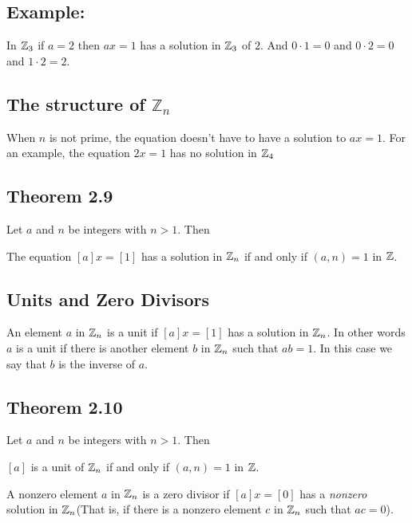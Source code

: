 \documentclass{article}
\begin{document}
\subsection*{Example:}
In $\mathbb{Z}_3$ if $a = 2$ then $ax=1$ has a solution in $\mathbb{Z}_3$ of $2$. And $0 \cdot 1 = 0$ and $0 \cdot 2 = 0$ and $1 \cdot 2 = 2$.

\subsection*{The structure of $\mathbb{Z}_n$}
When $n$ is not prime, the equation doesn't have to have a solution to $ax=1$. For an example, the equation $2x=1$ has no solution
in $\mathbb{Z}_4$

\subsection*{Theorem 2.9}
Let $a$ and $n$ be integers with $n > 1$. Then
\begin{center}
    The equation $[a]x=[1]$ has a solution in $\mathbb{Z}_n$ if and only if $(a,n)=1$ in $\mathbb{Z}$.
\end{center}
\subsection*{Units and Zero Divisors}
An element $a$ in $\mathbb{Z}_n$ is a unit if $[a]x=[1]$ has a solution in $\mathbb{Z}_n$. In other words $a$ is a unit if
there is another element $b$ in $\mathbb{Z}_n$ such that $ab=1$. In this case we say that $b$ is the inverse of $a$.
\subsection*{Theorem 2.10}
Let $a$ and $n$ be integers with $n > 1$. Then
\begin{center}
    $[a]$ is a unit of $\mathbb{Z}_n$ if and only if $(a,n)=1$ in $\mathbb{Z}$.
\end{center}

A nonzero element $a$ in $\mathbb{Z}_n$ is a zero divisor if $[a]x=[0]$ has a \textit{nonzero} solution in 
$\mathbb{Z}_n$(That is, if there is a nonzero element $c$ in $\mathbb{Z}_n$ such that $ac=0$).
\end{document}
